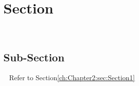 \lipsum[10]
\section{Section}
~\label{ch:Chapter2:sec:Section1}
\lipsum[10]


\subsection{Sub-Section}
~\label{ch:Chapter2:sec:Section1:sec:SubSection1}
Refer to Section\space\ref{ch:Chapter2:sec:Section1}